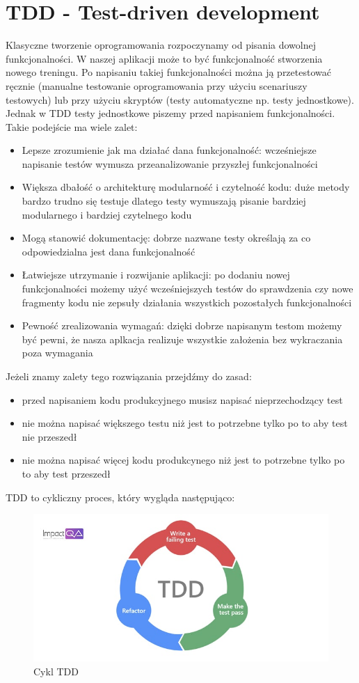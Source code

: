 \documentclass{article}
\begin{document}
\section{TDD - Test-driven development}
      Klasyczne tworzenie oprogramowania rozpoczynamy od pisania dowolnej funkcjonalności. W naszej aplikacji może to być funkcjonalność stworzenia nowego treningu. Po napisaniu takiej funkcjonalności można ją przetestować ręcznie (manualne testowanie oprogramowania przy użyciu scenariuszy testowych) lub przy użyciu skryptów (testy automatyczne np. testy jednostkowe). Jednak w TDD testy jednostkowe piszemy przed napisaniem funkcjonalności. Takie podejście ma wiele zalet:
      \begin{itemize}
            \item Lepsze zrozumienie jak ma działać dana funkcjonalność: wcześniejsze napisanie testów wymusza przeanalizowanie przyszłej funkcjonalności
            \item Większa dbałość o architekturę modularność i czytelność kodu: duże metody bardzo trudno się testuje dlatego testy wymuszają pisanie bardziej modularnego i bardziej czytelnego kodu
            \item Mogą stanowić dokumentację: dobrze nazwane testy określają za co odpowiedzialna jest dana funkcjonalność
            \item Łatwiejsze utrzymanie i rozwijanie aplikacji: po dodaniu nowej funkcjonalności możemy użyć wcześniejszych testów do sprawdzenia czy nowe fragmenty kodu nie zepsuły działania wszystkich pozostałych funkcjonalności
            \item Pewność zrealizowania wymagań: dzięki dobrze napisanym testom możemy być pewni, że nasza aplkacja realizuje wszystkie założenia bez wykraczania poza wymagania 
      \end{itemize}
      Jeżeli znamy zalety tego rozwiązania przejdźmy do zasad:
      \begin{itemize}
            \item przed napisaniem kodu produkcyjnego musisz napisać nieprzechodzący test
            \item nie można napisać większego testu niż jest to potrzebne tylko po to aby test nie przeszedł
            \item nie można napisać więcej kodu produkcynego niż jest to potrzebne tylko po to aby test przeszedł
      \end{itemize}
      TDD to cykliczny proces, który wygląda następująco:
      \begin{figure}
            \centering
            \includegraphics[width=0.9\linewidth]{tdd.jpg}
            \caption{Cykl TDD}
      \end{figure}
\end{document}
